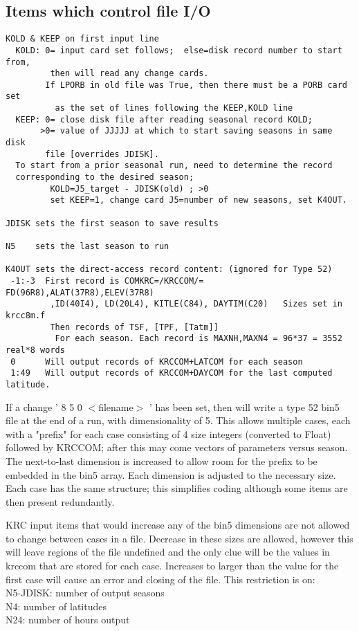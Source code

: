 \documentclass{article}
\newcommand{\qi}{\\ \hspace*{2.em}}      %
\begin{document}
\subsection{Items which control file I/O } %
\vspace{-3.mm} 
\begin{verbatim}
KOLD & KEEP on first input line
  KOLD: 0= input card set follows;  else=disk record number to start from,
         then will read any change cards.
        If LPORB in old file was True, then there must be a PORB card set 
          as the set of lines following the KEEP,KOLD line
  KEEP: 0= close disk file after reading seasonal record KOLD;
       >0= value of JJJJJ at which to start saving seasons in same disk 
        file [overrides JDISK].
  To start from a prior seasonal run, need to determine the record 
  corresponding to the desired season;
         KOLD=J5_target - JDISK(old) ; >0
         set KEEP=1, change card J5=number of new seasons, set K4OUT.

JDISK sets the first season to save results

N5    sets the last season to run

K4OUT sets the direct-access record content: (ignored for Type 52)
 -1:-3  First record is COMKRC=/KRCCOM/= FD(96R8),ALAT(37R8),ELEV(37R8)
         ,ID(40I4), LD(20L4), KITLE(C84), DAYTIM(C20)   Sizes set in krcc8m.f
         Then records of TSF, [TPF, [Tatm]]
          For each season. Each record is MAXNH,MAXN4 = 96*37 = 3552 real*8 words
 0      Will output records of KRCCOM+LATCOM for each season
 1:49   Will output records of KRCCOM+DAYCOM for the last computed latitude.
\end{verbatim}

If a change ' 8 5 0 $<$filename$>$ ' has been set, then will write a type 52
bin5 file at the end of a run, with dimensionality of 5. This allows multiple
cases, each with a "prefix" for each case consisting of 4 size integers
(converted to Float) followed by KRCCOM; after this may come vectors of
parameters versus season. The next-to-last dimension is increased to allow room
for the prefix to be embedded in the bin5 array.  Each dimension is adjusted to
the necessary size. Each case has the same structure; this simplifies coding
although some items are then present redundantly.

KRC input items that would increase any of the bin5 dimensions are not allowed
to change between cases in a file. Decrease in these sizes are allowed, however
this will leave regions of the file undefined and the only clue will be the
values in krccom that are stored for each case. Increases to larger than the
value for the first case will cause an error and closing of the file. This
restriction is on:
\qi N5-JDISK: number of output seasons
\qi N4: number of latitudes
\qi N24: number of hours output
\end{document}
